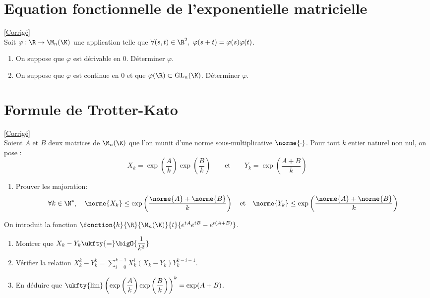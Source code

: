 \documentclass{book}
\begin{document}
\section{Equation fonctionnelle de l'exponentielle matricielle }
\textcolor{blue}{\hyperref[sec:equation-fonctionnelle-de-lexponentielle-matricielle-etoile3]{[Corrigé]}}\\
\label{Equation fonctionnelle de l'exponentielle matricielle}
Soit $\varphi:\R\to \M_n(\K)$ une application telle que $\forall (s,t)\in \R^2,\ \varphi(s+t)=\varphi(s)\varphi(t)$.
\begin{enumerate}
	\item On suppose que $\varphi$ est dérivable en $0$. Déterminer $\varphi$.
	\item On suppose que $\varphi$ est continue en $0$ et que $\varphi(\R)\subset \text{GL}_n(\K)$. Déterminer $\varphi$.
\end{enumerate}

\section{Formule de Trotter-Kato }
\textcolor{blue}{\hyperref[sec:formule-de-trotter-kato-etoile2]{[Corrigé]}}\\
\label{Formule de Trotter-Kato}
Soient $A$ et $B$ deux matrices de $\M_n(\K)$ que l'on munit d'une norme sous-multiplicative $\norme{\cdot}$. Pour tout $k$ entier naturel non nul, on pose : $$X_k=\exp\left(\frac{A}{k}\right)\exp\left(\frac{B}{k}\right) \qquad \text{et} \qquad Y_k=\exp\left(\frac{A+B}{k}\right)$$
\begin{enumerate}
	\item Prouver les majoration: $$\forall k\in\N^*, \quad \norme{X_k}\leq\exp\left(\frac{\norme{A}+\norme{B}}{k}\right) \quad \text{et} \quad \norme{Y_k}\leq\exp\left(\frac{\norme{A}+\norme{B}}{k}\right)$$
\end{enumerate}
On introduit la fonction $\fonction{h}{\R}{\M_n(\K)}{t}{e^{tA}e^{tB}-e^{t(A+B)}}$.
\begin{enumerate}[resume]
	\item Montrer que $X_k-Y_k\ukfty{=}\bigO{\displaystyle\frac{1}{k^2}}$
	\item Vérifier la relation $X_k^k-Y_k^k=\displaystyle\sum_{i=0}^{k-1}X_k^i(X_k-Y_k)Y_k^{k-i-1}$.
	\item En déduire que $\displaystyle\ukfty{\lim}\left(\exp\left(\frac{A}{k}\right)\exp\left(\frac{B}{k}\right)\right)^k=\exp(A+B)$.
\end{enumerate}
\end{document}
